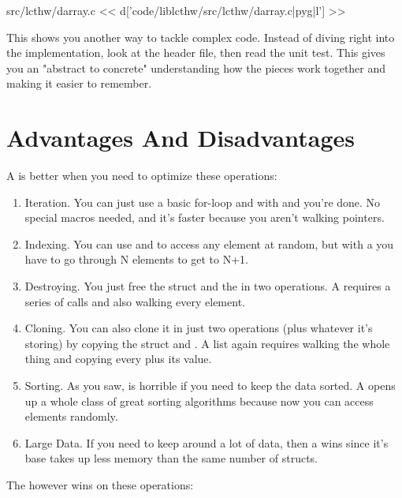 \begin{code}{src/lcthw/darray.c}
<< d['code/liblcthw/src/lcthw/darray.c|pyg|l'] >>
\end{code}

This shows you another way to tackle complex code.  Instead of diving right
into the  implementation, look at the header file, then read the
unit test.  This gives you an "abstract to concrete" understanding how the
pieces work together and making it easier to remember.

\section{Advantages And Disadvantages}

A  is better when you need to optimize these operations:

\begin{enumerate}
\item Iteration.  You can just use a basic for-loop and 
    with  and you're done.  No special macros needed, and
    it's faster because you aren't walking pointers.
\item Indexing.  You can use  and  to
    access any element at random, but with a  you have to go
    through N elements to get to N+1.
\item Destroying.  You just free the struct and the  in 
    two operations.  A  requires a series of  calls
    and also walking every element.
\item Cloning. You can also clone it in just two operations (plus whatever
        it's storing) by copying the struct and .  A list
        again requires walking the whole thing and copying every 
        plus its value.
\item Sorting. As you saw,  is horrible if you need to keep the
    data sorted.  A  opens up a whole class of great sorting
    algorithms because now you can access elements randomly.
\item Large Data. If you need to keep around a lot of data, then a 
    wins since it's base  takes up less memory than the same
    number of  structs.
\end{enumerate}

The  however wins on these operations:

